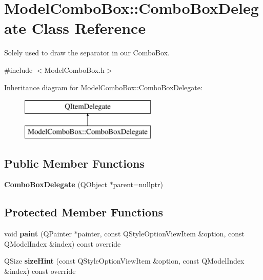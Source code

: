 \hypertarget{class_model_combo_box_1_1_combo_box_delegate}{}\section{Model\+Combo\+Box\+:\+:Combo\+Box\+Delegate Class Reference}
\label{class_model_combo_box_1_1_combo_box_delegate}


Solely used to draw the separator in our Combo\+Box.  




{\ttfamily \#include $<$Model\+Combo\+Box.\+h$>$}

Inheritance diagram for Model\+Combo\+Box\+:\+:Combo\+Box\+Delegate\+:\begin{figure}[H]
\begin{center}
\leavevmode
\includegraphics[height=2.000000cm]{class_model_combo_box_1_1_combo_box_delegate}
\end{center}
\end{figure}
\subsection*{Public Member Functions}
\begin{DoxyCompactItemize}
\item 
\hypertarget{class_model_combo_box_1_1_combo_box_delegate_aecba0317928334ec4e594d3f9f89002d}{}{\bfseries Combo\+Box\+Delegate} (Q\+Object $\ast$parent=nullptr)\label{class_model_combo_box_1_1_combo_box_delegate_aecba0317928334ec4e594d3f9f89002d}

\end{DoxyCompactItemize}
\subsection*{Protected Member Functions}
\begin{DoxyCompactItemize}
\item 
\hypertarget{class_model_combo_box_1_1_combo_box_delegate_a8a18abb747affce59745f6b5ed9d2236}{}void {\bfseries paint} (Q\+Painter $\ast$painter, const Q\+Style\+Option\+View\+Item \&option, const Q\+Model\+Index \&index) const  override\label{class_model_combo_box_1_1_combo_box_delegate_a8a18abb747affce59745f6b5ed9d2236}

\item 
\hypertarget{class_model_combo_box_1_1_combo_box_delegate_aa0358f61d07c973d5c229bfae522de90}{}Q\+Size {\bfseries size\+Hint} (const Q\+Style\+Option\+View\+Item \&option, const Q\+Model\+Index \&index) const  override\label{class_model_combo_box_1_1_combo_box_delegate_aa0358f61d07c973d5c229bfae522de90}

\end{DoxyCompactItemize}


